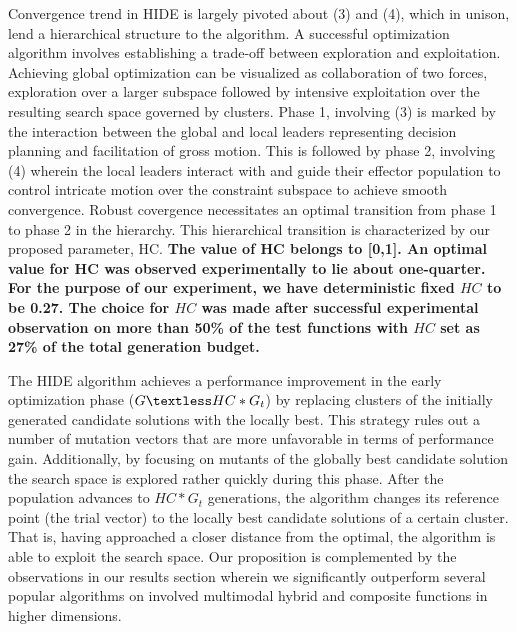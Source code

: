 \documentclass[a4paper,twoside]{article}
\begin{document}
Convergence trend in HIDE is largely pivoted about (3) and (4), which in unison, lend a hierarchical structure to the algorithm. A successful optimization algorithm involves establishing a trade-off between exploration and exploitation. Achieving global optimization can be visualized as collaboration of two forces, exploration over a larger subspace followed by intensive exploitation over the resulting search space governed by clusters. Phase 1, involving (3) is marked by the interaction between the global and local leaders representing decision planning and facilitation of gross motion. This is followed by phase 2, involving (4) wherein the local leaders interact with and guide their effector population to control intricate motion over the constraint subspace to achieve smooth convergence. Robust covergence necessitates an optimal transition from phase 1 to phase 2 in the hierarchy. This hierarchical transition is characterized by our proposed parameter, HC. \textbf{The value of HC belongs to [0,1]. An optimal value for HC was observed experimentally to lie about one-quarter. For the purpose of our experiment, we have deterministic fixed $HC$ to be 0.27. The choice for $HC$ was made after successful experimental observation on more than 50\% of the test functions with $HC$ set as 27\% of the total generation budget.}

The HIDE algorithm achieves a performance improvement in the early optimization phase ($G \textless HC*G_{t}$) by replacing clusters of the initially generated candidate solutions with the locally best. This strategy rules out a number of mutation vectors that are more unfavorable in terms of performance gain. Additionally, by focusing on mutants of the globally best candidate solution the search space is explored rather quickly during this phase. After the population advances to $HC*G_{t}$ generations, the algorithm changes its reference point (the trial vector) to the locally best candidate solutions of a certain cluster. That is, having approached a closer distance from the optimal, the algorithm is able to exploit the search space. Our proposition is complemented by the observations in our results section wherein we significantly outperform several popular algorithms on involved multimodal hybrid and composite functions in higher dimensions.
\end{document}
